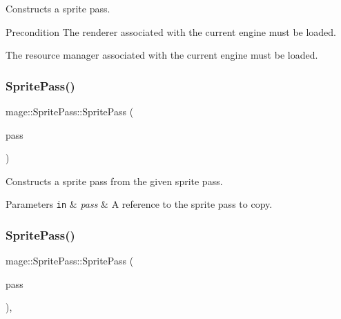 Constructs a sprite pass.

\begin{DoxyPrecond}{Precondition}
The renderer associated with the current engine must be loaded. 

The resource manager associated with the current engine must be loaded. 
\end{DoxyPrecond}
\hypertarget{classmage_1_1_sprite_pass_a84e07e1e8590db93e88697f827a26615}{}\label{classmage_1_1_sprite_pass_a84e07e1e8590db93e88697f827a26615} 
\subsubsection{\texorpdfstring{Sprite\+Pass()}{SpritePass()}\hspace{0.1cm}{\footnotesize\ttfamily [2/3]}}
{\footnotesize\ttfamily mage\+::\+Sprite\+Pass\+::\+Sprite\+Pass (\begin{DoxyParamCaption}\item[{const \hyperlink{classmage_1_1_sprite_pass}{Sprite\+Pass} \&}]{pass }\end{DoxyParamCaption})\hspace{0.3cm}{\ttfamily [delete]}}

Constructs a sprite pass from the given sprite pass.


\begin{DoxyParams}[1]{Parameters}
\mbox{\tt in}  & {\em pass} & A reference to the sprite pass to copy. \\
\hline
\end{DoxyParams}
\hypertarget{classmage_1_1_sprite_pass_a52cbd066748f6f111924d37e1db22e5e}{}\label{classmage_1_1_sprite_pass_a52cbd066748f6f111924d37e1db22e5e} 
\subsubsection{\texorpdfstring{Sprite\+Pass()}{SpritePass()}\hspace{0.1cm}{\footnotesize\ttfamily [3/3]}}
{\footnotesize\ttfamily mage\+::\+Sprite\+Pass\+::\+Sprite\+Pass (\begin{DoxyParamCaption}\item[{\hyperlink{classmage_1_1_sprite_pass}{Sprite\+Pass} \&\&}]{pass }\end{DoxyParamCaption})\hspace{0.3cm}{\ttfamily [default]}, {\ttfamily [noexcept]}}

